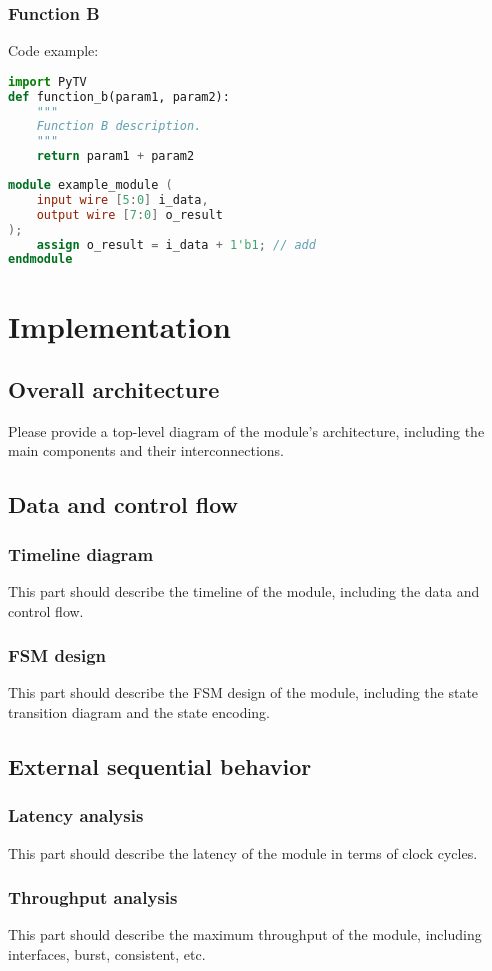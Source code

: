 \documentclass[a4paper, oneside]{report}
\begin{document}
            \subsection{Function B}

            Code example:

            \begin{lstlisting}[language=Python]
import PyTV
def function_b(param1, param2):
    """
    Function B description.
    """
    return param1 + param2
            \end{lstlisting}
            \begin{lstlisting}[language=Verilog]
module example_module (
    input wire [5:0] i_data,
    output wire [7:0] o_result
);
    assign o_result = i_data + 1'b1; // add
endmodule
            \end{lstlisting}

    \chapter{Implementation}
        \section{Overall architecture}
                Please provide a top-level diagram of the module's architecture, including the main components and their interconnections.
        \section{Data and control flow}
            \subsection{Timeline diagram}
                This part should describe the timeline of the module, including the data and control flow.
            \subsection{FSM design}
                This part should describe the FSM design of the module, including the state transition diagram and the state encoding.
        \section{External sequential behavior}
            \subsection{Latency analysis}
                This part should describe the latency of the module in terms of clock cycles.
            \subsection{Throughput analysis}
                This part should describe the maximum throughput of the module, including interfaces, burst, consistent, etc.


    \printbibliography[title={References},heading=bibintoc]
\end{document}
